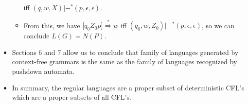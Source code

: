 \documentclass[]{article}
\begin{document}
\begin{itemize}
\begin{itemize}
        iff $(q,w,X) |-^* (p,\epsilon,\epsilon)$.
        \item From this, we have $\lbrack q_0Z_0p \rbrack \overset{*}
        {\Rightarrow} w$ iff $(q_0,w,Z_0) |-^* (p,\epsilon,\epsilon)$, so we can 
        conclude $L(G) = N(P)$.
      \end{itemize}
    \item Sections 6 and 7 allow us to conclude that family of languages 
    generated by context-free grammars is the same as the family of languages
    recognized by pushdown automata.
    \item In summary, the regular languages are a proper subset of deterministic
    CFL's which are a proper subsets of all CFL's.
  \end{itemize}
\end{document}
